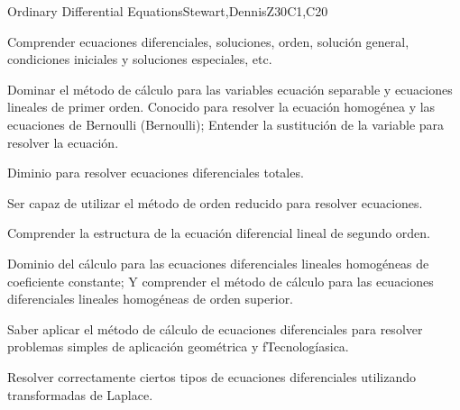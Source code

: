 \begin{syllabus}
\begin{unit}{Ordinary Differential Equations}{}{Stewart,DennisZ}{30}{C1,C20}
   \begin{learningoutcomes}
    \item Comprender ecuaciones diferenciales, soluciones, orden, solución general, condiciones iniciales y soluciones especiales, etc.
    \item Dominar el método de cálculo para las variables ecuación separable y ecuaciones lineales de primer orden. Conocido para resolver la ecuación homogénea y las ecuaciones de Bernoulli (Bernoulli); Entender la sustitución de la variable para resolver la ecuación.
    \item Diminio  para resolver ecuaciones diferenciales totales.
    \item Ser capaz de utilizar el método de orden reducido para resolver ecuaciones.
    \item Comprender la estructura de la ecuación diferencial lineal de segundo orden.
    \item Dominio del cálculo para las ecuaciones diferenciales lineales homogéneas de coeficiente constante; Y comprender el método de cálculo para las ecuaciones diferenciales lineales homogéneas de orden superior.
    \item Saber aplicar el método de cálculo de ecuaciones diferenciales para resolver problemas simples de aplicación geométrica y fTecnologíasica.
    \item Resolver correctamente ciertos tipos de ecuaciones diferenciales utilizando transformadas de Laplace.

   \end{learningoutcomes}
\end{unit}

\begin{coursebibliography}
\end{coursebibliography}

\end{syllabus}
